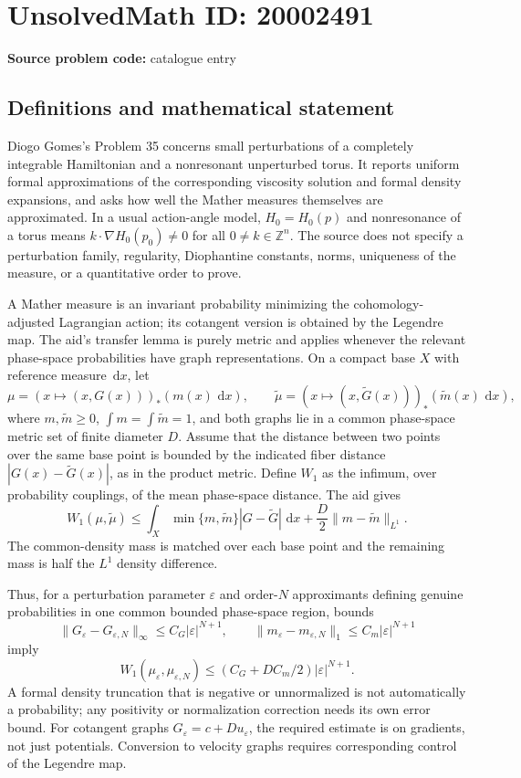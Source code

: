 \documentclass[11pt]{article}
\newcommand{\Z}{\mathbb{Z}}
\newcommand{\dd}{\,\mathrm{d}}
\begin{document}
\section*{UnsolvedMath ID: 20002491}
\textbf{Source problem code:} catalogue entry
\subsection{Definitions and mathematical statement}
Diogo Gomes's Problem 35 concerns small perturbations of a completely integrable Hamiltonian and a nonresonant unperturbed torus. It reports uniform formal approximations of the corresponding viscosity solution and formal density expansions, and asks how well the Mather measures themselves are approximated. In a usual action-angle model, \(H_0=H_0(p)\) and nonresonance of a torus means \(k\cdot\nabla H_0(p_0)\ne0\) for all \(0\ne k\in\Z^n\). The source does not specify a perturbation family, regularity, Diophantine constants, norms, uniqueness of the measure, or a quantitative order to prove.

A Mather measure is an invariant probability minimizing the cohomology-adjusted Lagrangian action; its cotangent version is obtained by the Legendre map. The aid's transfer lemma is purely metric and applies whenever the relevant phase-space probabilities have graph representations. On a compact base \(X\) with reference measure \(\dd x\), let
\[
 \mu=(x\mapsto(x,G(x)))_*(m(x)\,\dd x),\qquad
 \widetilde\mu=(x\mapsto(x,\widetilde G(x)))_*(\widetilde m(x)\,\dd x),
\]
where \(m,\widetilde m\ge0\), \(\int m=\int\widetilde m=1\), and both graphs lie in a common phase-space metric set of finite diameter \(D\). Assume that the distance between two points over the same base point is bounded by the indicated fiber distance \(|G(x)-\widetilde G(x)|\), as in the product metric. Define \(W_1\) as the infimum, over probability couplings, of the mean phase-space distance. The aid gives
\[
 W_1(\mu,\widetilde\mu)
 \le\int_X\min\{m,\widetilde m\}|G-\widetilde G|\,\dd x
 +\frac D2\|m-\widetilde m\|_{L^1}.
\]
The common-density mass is matched over each base point and the remaining mass is half the \(L^1\) density difference.

Thus, for a perturbation parameter \(\varepsilon\) and order-\(N\) approximants defining genuine probabilities in one common bounded phase-space region, bounds
\[
 \|G_\varepsilon-G_{\varepsilon,N}\|_\infty
 \le C_G|\varepsilon|^{N+1},\qquad
 \|m_\varepsilon-m_{\varepsilon,N}\|_1
 \le C_m|\varepsilon|^{N+1}
\]
imply
\[
 W_1(\mu_\varepsilon,\mu_{\varepsilon,N})
 \le(C_G+DC_m/2)|\varepsilon|^{N+1}.
\]
A formal density truncation that is negative or unnormalized is not automatically a probability; any positivity or normalization correction needs its own error bound. For cotangent graphs \(G_\varepsilon=c+D u_\varepsilon\), the required estimate is on gradients, not just potentials. Conversion to velocity graphs requires corresponding control of the Legendre map.
\end{document}
